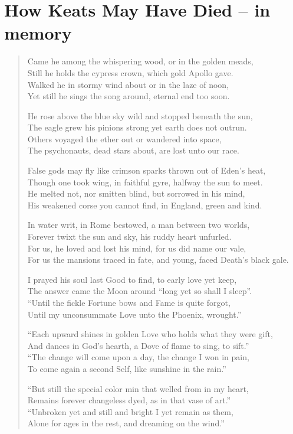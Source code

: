 \section{How Keats May Have Died – in memory}

\begin{verse}
Came he among the whispering wood, or in the golden meads,\\
Still he holds the cypress crown, which gold Apollo gave.\\
Walked he in stormy wind about or in the laze of noon,\\
Yet still he sings the song around, eternal end too soon.

He rose above the blue sky wild and stopped beneath the sun,\\
The eagle grew his pinions strong yet earth does not outrun.\\
Others voyaged the ether out or wandered into space,\\
The psychonauts, dead stars about, are lost unto our race.

False gods may fly like crimson sparks thrown out of Eden's heat,\\
Though one took wing, in faithful gyre, halfway the sun to meet.\\
He melted not, nor smitten blind, but sorrowed in his mind,\\
His weakened corse you cannot find, in England, green and kind.

In water writ, in Rome bestowed, a man between two worlds,\\
Forever twixt the sun and sky, his ruddy heart unfurled.\\
For us, he loved and lost his mind, for us did name our vale,\\
For us the mansions traced in fate, and young, faced Death's black gale.

I prayed his soul last Good to find, to early love yet keep,\\
The answer came the Moon around ``long yet so shall I sleep''.\\
``Until the fickle Fortune bows and Fame is quite forgot,\\
Until my unconsummate Love unto the Phoenix, wrought.''

``Each upward shines in golden Love who holds what they were gift,\\
And dances in God's hearth, a Dove of flame to sing, to sift.''\\
``The change will come upon a day, the change I won in pain,\\
To come again a second Self, like sunshine in the rain.''

``But still the special color min that welled from in my heart,\\
Remains forever changeless dyed, as in that vase of art.''\\
``Unbroken yet and still and bright I yet remain as them,\\
Alone for ages in the rest, and dreaming on the wind.''
\end{verse}



